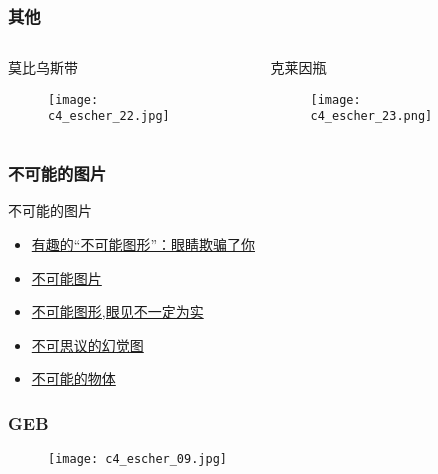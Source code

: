 \begin{frame}
  \frametitle{其他}
  \begin{columns}
    \begin{block}{莫比乌斯带}
      \begin{figure}
        \centering
        \texttt{[image: c4\_escher\_22.jpg]}
      \end{figure}
    \end{block}
    \begin{block}{克莱因瓶}
      \begin{figure}
        \centering
        \texttt{[image: c4\_escher\_23.png]}
      \end{figure}
    \end{block}
  \end{columns}
\end{frame}

\begin{frame}
  \frametitle{不可能的图片}
  \begin{block}{不可能的图片}
    \begin{itemize}
      \item \href{http://news.xinhuanet.com/tech/2009-03/25/content_11072865.htm}{有趣的“不可能图形”：眼睛欺骗了你}
      \item \href{http://www.360doc.com/content/14/0626/17/699582_390050495.shtml}{不可能图片}
      \item \href{http://www.yi2.net/article/201606/13115.html}{不可能图形,眼见不一定为实}
      \item \href{http://yaoyao33.lofter.com/post/bcfa4_70ac2d3}{不可思议的幻觉图}
      \item \href{https://cn.depositphotos.com/vector-images/\%E4\%B8\%8D\%E5\%8F\%AF\%E8\%83\%BD\%E7\%9A\%84\%E7\%89\%A9\%E4\%BD\%93.html}{不可能的物体}
    \end{itemize}
  \end{block}
\end{frame}

\begin{frame}
  \frametitle{GEB}
  \begin{figure}
    \centering
    \texttt{[image: c4\_escher\_09.jpg]}
  \end{figure}
\end{frame}

